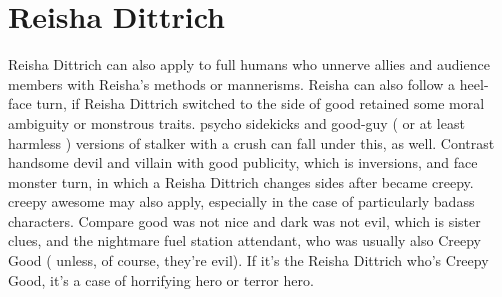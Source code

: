 \documentclass[12pt]{book}
\begin{document}
\chapter{Reisha Dittrich}
Reisha Dittrich can also apply to full humans who unnerve allies and audience members with Reisha's methods or mannerisms. Reisha can also follow a heel-face turn, if Reisha Dittrich switched to the side of good retained some moral ambiguity or monstrous traits. psycho sidekicks and good-guy ( or at least harmless ) versions of stalker with a crush can fall under this, as well. Contrast handsome devil and villain with good publicity, which is inversions, and face monster turn, in which a Reisha Dittrich changes sides after became creepy. creepy awesome may also apply, especially in the case of particularly badass characters. Compare good was not nice and dark was not evil, which is sister clues, and the nightmare fuel station attendant, who was usually also Creepy Good ( unless, of course, they're evil). If it's the Reisha Dittrich who's Creepy Good, it's a case of horrifying hero or terror hero.
\end{document}
